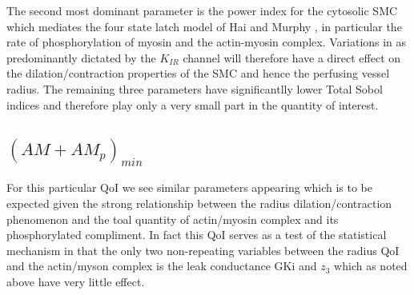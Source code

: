 The second most dominant parameter is the power index for the cytosolic SMC \ca which mediates the four state latch model of Hai and Murphy \cite{Hai1988}, in particular the rate of phosphorylation of  myosin and the actin-myosin complex.  Variations in \ca as predominantly dictated by the $K_{IR}$ channel will therefore have a direct effect on the dilation/contraction properties of the SMC and hence the perfusing vessel radius.  
The remaining three parameters have significantlly lower Total Sobol indices and therefore play only a very small part in the quantity of interest.\\
 
\subsection{$(AM+AM_p)_{min}$}
For this particular QoI we see similar parameters appearing which is to be expected given the strong relationship between the radius dilation/contraction phenomenon and the toal quantity of actin/myosin complex and its phosphorylated compliment. In fact this QoI serves as a test of the statistical mechanism in that the only two non-repeating variables between the radius QoI and the actin/myson complex is the leak conductance GKi and $z_3$ which as noted above have very little effect. 
